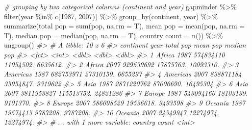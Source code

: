 \documentclass[
]{book}
\newenvironment{Shaded}{\begin{snugshade}}{\end{snugshade}}
\newcommand{\AttributeTok}[1]{\textcolor[rgb]{0.77,0.63,0.00}{#1}}
\newcommand{\CommentTok}[1]{\textcolor[rgb]{0.56,0.35,0.01}{\textit{#1}}}
\newcommand{\DecValTok}[1]{\textcolor[rgb]{0.00,0.00,0.81}{#1}}
\newcommand{\FunctionTok}[1]{\textcolor[rgb]{0.00,0.00,0.00}{#1}}
\newcommand{\NormalTok}[1]{#1}
\newcommand{\OtherTok}[1]{\textcolor[rgb]{0.56,0.35,0.01}{#1}}
\newcommand{\SpecialCharTok}[1]{\textcolor[rgb]{0.00,0.00,0.00}{#1}}
\newcommand{\StringTok}[1]{\textcolor[rgb]{0.31,0.60,0.02}{#1}}
\begin{document}
\begin{Shaded}
\begin{Highlighting}[]
\CommentTok{\# grouping by two categorical columns (continent and year)}
\NormalTok{gapminder }\SpecialCharTok{\%\textgreater{}\%}
  \FunctionTok{filter}\NormalTok{(year }\SpecialCharTok{\%in\%} \FunctionTok{c}\NormalTok{(}\DecValTok{1987}\NormalTok{, }\DecValTok{2007}\NormalTok{)) }\SpecialCharTok{\%\textgreater{}\%}
  \FunctionTok{group\_by}\NormalTok{(continent, year) }\SpecialCharTok{\%\textgreater{}\%}
  \FunctionTok{summarize}\NormalTok{(}\StringTok{\textasciigrave{}}\AttributeTok{total pop}\StringTok{\textasciigrave{}} \OtherTok{=} \FunctionTok{sum}\NormalTok{(pop, }\AttributeTok{na.rm =}\NormalTok{ T), }
            \StringTok{\textasciigrave{}}\AttributeTok{mean pop}\StringTok{\textasciigrave{}} \OtherTok{=} \FunctionTok{mean}\NormalTok{(pop, }\AttributeTok{na.rm =}\NormalTok{ T), }
            \StringTok{\textasciigrave{}}\AttributeTok{median pop}\StringTok{\textasciigrave{}} \OtherTok{=} \FunctionTok{median}\NormalTok{(pop, }\AttributeTok{na.rm =}\NormalTok{ T), }
            \StringTok{\textasciigrave{}}\AttributeTok{country count}\StringTok{\textasciigrave{}} \OtherTok{=} \FunctionTok{n}\NormalTok{()) }\SpecialCharTok{\%\textgreater{}\%}
  \FunctionTok{ungroup}\NormalTok{()}
\CommentTok{\#\textgreater{} \# A tibble: 10 x 6}
\CommentTok{\#\textgreater{}    continent  year \textasciigrave{}total pop\textasciigrave{} \textasciigrave{}mean pop\textasciigrave{} \textasciigrave{}median pop\textasciigrave{}}
\CommentTok{\#\textgreater{}    \textless{}fct\textgreater{}     \textless{}int\textgreater{}       \textless{}dbl\textgreater{}      \textless{}dbl\textgreater{}        \textless{}dbl\textgreater{}}
\CommentTok{\#\textgreater{}  1 Africa     1987   574834110  11054502.     6635612.}
\CommentTok{\#\textgreater{}  2 Africa     2007   929539692  17875763.    10093310.}
\CommentTok{\#\textgreater{}  3 Americas   1987   682753971  27310159.     6655297 }
\CommentTok{\#\textgreater{}  4 Americas   2007   898871184  35954847.     9319622 }
\CommentTok{\#\textgreater{}  5 Asia       1987  2871220762  87006690.    16495304 }
\CommentTok{\#\textgreater{}  6 Asia       2007  3811953827 115513752.    24821286 }
\CommentTok{\#\textgreater{}  7 Europe     1987   543094160  18103139.     9101370.}
\CommentTok{\#\textgreater{}  8 Europe     2007   586098529  19536618.     9493598 }
\CommentTok{\#\textgreater{}  9 Oceania    1987    19574415   9787208.     9787208.}
\CommentTok{\#\textgreater{} 10 Oceania    2007    24549947  12274974.    12274974.}
\CommentTok{\#\textgreater{} \# ... with 1 more variable: country count \textless{}int\textgreater{}}


\end{Highlighting}
\end{Shaded}
\end{document}
